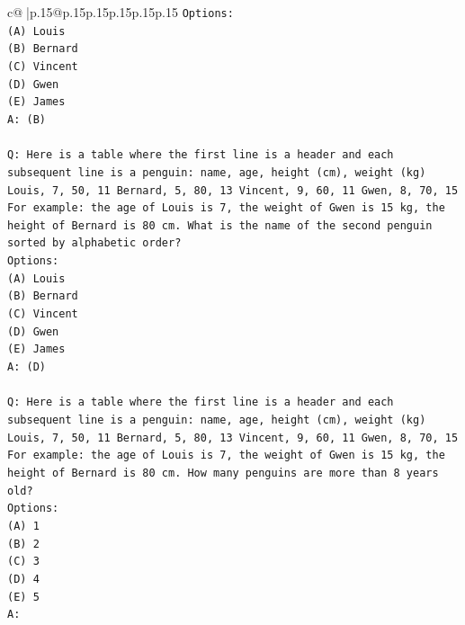 \documentclass{article}
\begin{document}
{\begin{supertabular}{c@{$\;$}|p{.15\linewidth}@{}p{.15\linewidth}p{.15\linewidth}p{.15\linewidth}p{.15\linewidth}p{.15\linewidth}}
{{{\texttt{Options:} \\
\texttt{(A) Louis} \\
\texttt{(B) Bernard} \\
\texttt{(C) Vincent} \\
\texttt{(D) Gwen} \\
\texttt{(E) James} \\
\texttt{A: (B)} \\
\\ 
\texttt{Q: Here is a table where the first line is a header and each subsequent line is a penguin:  name, age, height (cm), weight (kg) Louis, 7, 50, 11 Bernard, 5, 80, 13 Vincent, 9, 60, 11 Gwen, 8, 70, 15  For example: the age of Louis is 7, the weight of Gwen is 15 kg, the height of Bernard is 80 cm.  What is the name of the second penguin sorted by alphabetic order?} \\
\texttt{Options:} \\
\texttt{(A) Louis} \\
\texttt{(B) Bernard} \\
\texttt{(C) Vincent} \\
\texttt{(D) Gwen} \\
\texttt{(E) James} \\
\texttt{A: (D)} \\
\\ 
\texttt{Q: Here is a table where the first line is a header and each subsequent line is a penguin:  name, age, height (cm), weight (kg) Louis, 7, 50, 11 Bernard, 5, 80, 13 Vincent, 9, 60, 11 Gwen, 8, 70, 15  For example: the age of Louis is 7, the weight of Gwen is 15 kg, the height of Bernard is 80 cm.  How many penguins are more than 8 years old?} \\
\texttt{Options:} \\
\texttt{(A) 1} \\
\texttt{(B) 2} \\
\texttt{(C) 3} \\
\texttt{(D) 4} \\
\texttt{(E) 5} \\
\texttt{A:} \\
            }
        }
    }
     \\ \\


\end{supertabular}}
\end{document}
